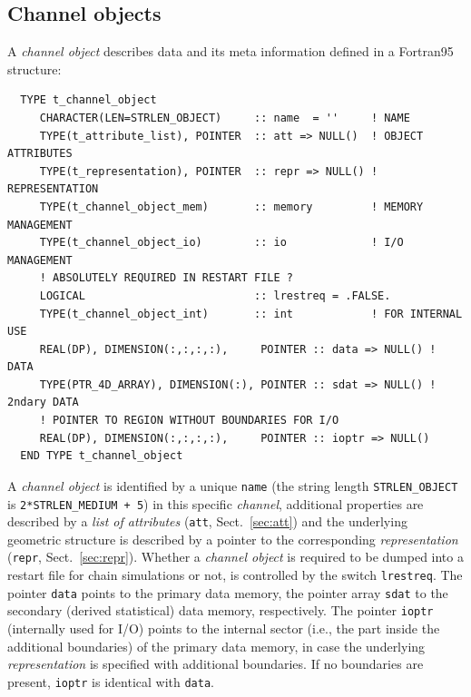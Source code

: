 \documentclass[twoside]{article}
\begin{document}
\subsection{Channel objects}
\label{sec:chanobj}

A {\it channel object} describes data and its meta information defined
in a Fortran95 structure:

\begin{verbatim}
  TYPE t_channel_object
     CHARACTER(LEN=STRLEN_OBJECT)     :: name  = ''     ! NAME
     TYPE(t_attribute_list), POINTER  :: att => NULL()  ! OBJECT ATTRIBUTES
     TYPE(t_representation), POINTER  :: repr => NULL() ! REPRESENTATION
     TYPE(t_channel_object_mem)       :: memory         ! MEMORY MANAGEMENT
     TYPE(t_channel_object_io)        :: io             ! I/O MANAGEMENT
     ! ABSOLUTELY REQUIRED IN RESTART FILE ?
     LOGICAL                          :: lrestreq = .FALSE.
     TYPE(t_channel_object_int)       :: int            ! FOR INTERNAL USE
     REAL(DP), DIMENSION(:,:,:,:),     POINTER :: data => NULL() ! DATA
     TYPE(PTR_4D_ARRAY), DIMENSION(:), POINTER :: sdat => NULL() ! 2ndary DATA
     ! POINTER TO REGION WITHOUT BOUNDARIES FOR I/O
     REAL(DP), DIMENSION(:,:,:,:),     POINTER :: ioptr => NULL()
  END TYPE t_channel_object
\end{verbatim}

A {\it channel object} is identified by a unique {\tt name}
(the string length {\tt STRLEN\_OBJECT} is {\tt 2*STRLEN\_MEDIUM + 5})
in this specific {\it channel}, additional properties are described by a
{\it list of attributes}
({\tt att}, Sect.~\ref{sec:att}) and the underlying geometric structure is
described by a pointer to the corresponding {\it representation}
({\tt repr}, Sect.~\ref{sec:repr}).
Whether a {\it channel object} is required to be dumped into a restart file
for chain simulations or not, is controlled by the switch {\tt lrestreq}.
The pointer {\tt data} points to the primary data memory, the pointer array
{\tt sdat} to the secondary (derived statistical) data memory, respectively.
%
The pointer {\tt ioptr} (internally used for I/O) points to the internal
sector (i.e., the part inside the additional boundaries) of the primary
data memory, in case the underlying {\it representation} is specified
with additional boundaries.
If no boundaries are present, {\tt ioptr} is identical with {\tt data}.
%
\end{document}
